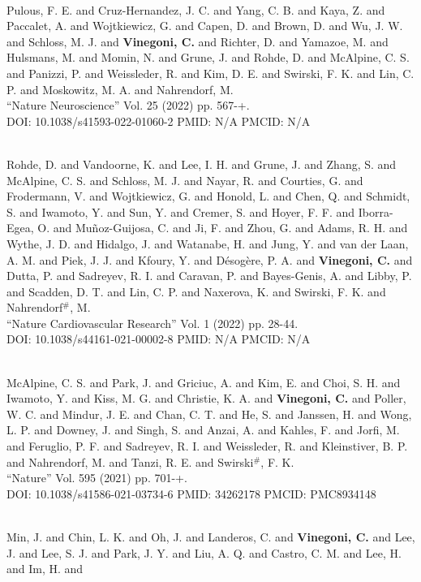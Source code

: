 \item {} \\ Pulous, F. E. and Cruz-Hernandez, J. C. and Yang, C. B. and Kaya, Z. and Paccalet, A. and Wojtkiewicz, G. and Capen, D. and Brown, D. and Wu, J. W. and Schloss, M. J. and {\bf Vinegoni, C.} and Richter, D. and Yamazoe, M. and Hulsmans, M. and Momin, N. and Grune, J. and Rohde, D. and McAlpine, C. S. and Panizzi, P. and Weissleder, R. and Kim, D. E. and Swirski, F. K. and Lin, C. P. and Moskowitz, M. A. and Nahrendorf, M. \\ ``Nature Neuroscience'' Vol. 25 (2022) pp. 567-+. \\ DOI: 10.1038/s41593-022-01060-2 PMID: N/A PMCID: N/A\item {} \\ Rohde, D. and Vandoorne, K. and Lee, I. H. and Grune, J. and Zhang, S. and McAlpine, C. S. and Schloss, M. J. and Nayar, R. and Courties, G. and Frodermann, V. and Wojtkiewicz, G. and Honold, L. and Chen, Q. and Schmidt, S. and Iwamoto, Y. and Sun, Y. and Cremer, S. and Hoyer, F. F. and Iborra-Egea, O. and Muñoz-Guijosa, C. and Ji, F. and Zhou, G. and Adams, R. H. and Wythe, J. D. and Hidalgo, J. and Watanabe, H. and Jung, Y. and van der Laan, A. M. and Piek, J. J. and Kfoury, Y. and Désogère, P. A. and {\bf Vinegoni, C.} and Dutta, P. and Sadreyev, R. I. and Caravan, P. and Bayes-Genis, A. and Libby, P. and Scadden, D. T. and Lin, C. P. and Naxerova, K. and Swirski, F. K. and Nahrendorf$^\#$, M. \\ ``Nature Cardiovascular Research'' Vol. 1 (2022) pp. 28-44. \\ DOI: 10.1038/s44161-021-00002-8 PMID: N/A PMCID: N/A\item {} \\ McAlpine, C. S. and Park, J. and Griciuc, A. and Kim, E. and Choi, S. H. and Iwamoto, Y. and Kiss, M. G. and Christie, K. A. and {\bf Vinegoni, C.} and Poller, W. C. and Mindur, J. E. and Chan, C. T. and He, S. and Janssen, H. and Wong, L. P. and Downey, J. and Singh, S. and Anzai, A. and Kahles, F. and Jorfi, M. and Feruglio, P. F. and Sadreyev, R. I. and Weissleder, R. and Kleinstiver, B. P. and Nahrendorf, M. and Tanzi, R. E. and Swirski$^\#$, F. K. \\ ``Nature'' Vol. 595 (2021) pp. 701-+. \\ DOI: 10.1038/s41586-021-03734-6 PMID: 34262178 PMCID: PMC8934148\item {} \\ Min, J. and Chin, L. K. and Oh, J. and Landeros, C. and {\bf Vinegoni, C.} and Lee, J. and Lee, S. J. and Park, J. Y. and Liu, A. Q. and Castro, C. M. and Lee, H. and Im, H. and 